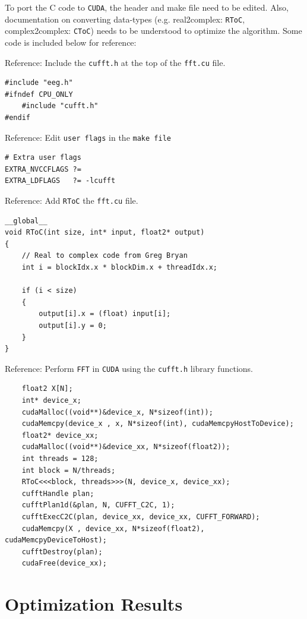 \documentclass[a4paper]{article}
\begin{document}
To port the C code to \texttt{CUDA}, the header and make file need to be edited. Also, documentation on converting data-types (e.g. real2complex: \texttt{RToC}, complex2complex: \texttt{CToC}) needs to be understood to optimize the algorithm. Some code is included below for reference:

\noindent Reference: Include the \texttt{cufft.h} at the top of the \texttt{fft.cu} file.
\begin{lstlisting}
#include "eeg.h"
#ifndef CPU_ONLY
	#include "cufft.h"
#endif
\end{lstlisting}

\noindent Reference: Edit \texttt{user flags} in the \texttt{make file}
\begin{lstlisting}
# Extra user flags
EXTRA_NVCCFLAGS ?=
EXTRA_LDFLAGS   ?= -lcufft
\end{lstlisting}

\noindent Reference: Add \texttt{RToC} the \texttt{fft.cu} file.
\begin{lstlisting}
__global__ 
void RToC(int size, int* input, float2* output)
{
	// Real to complex code from Greg Bryan
	int i = blockIdx.x * blockDim.x + threadIdx.x;

	if (i < size)
	{
		output[i].x = (float) input[i];
		output[i].y = 0;
	}
}
\end{lstlisting}

\noindent Reference: Perform \texttt{FFT} in \texttt{CUDA} using the \texttt{cufft.h} library functions.
\begin{lstlisting}
	float2 X[N];
	int* device_x;
	cudaMalloc((void**)&device_x, N*sizeof(int));
	cudaMemcpy(device_x , x, N*sizeof(int), cudaMemcpyHostToDevice);
	float2* device_xx;
	cudaMalloc((void**)&device_xx, N*sizeof(float2));
	int threads = 128;
	int block = N/threads;
	RToC<<<block, threads>>>(N, device_x, device_xx);
	cufftHandle plan;
	cufftPlan1d(&plan, N, CUFFT_C2C, 1);
	cufftExecC2C(plan, device_xx, device_xx, CUFFT_FORWARD);
	cudaMemcpy(X , device_xx, N*sizeof(float2), cudaMemcpyDeviceToHost);
	cufftDestroy(plan);
	cudaFree(device_xx);
\end{lstlisting}

\section{Optimization Results}
\end{document}
